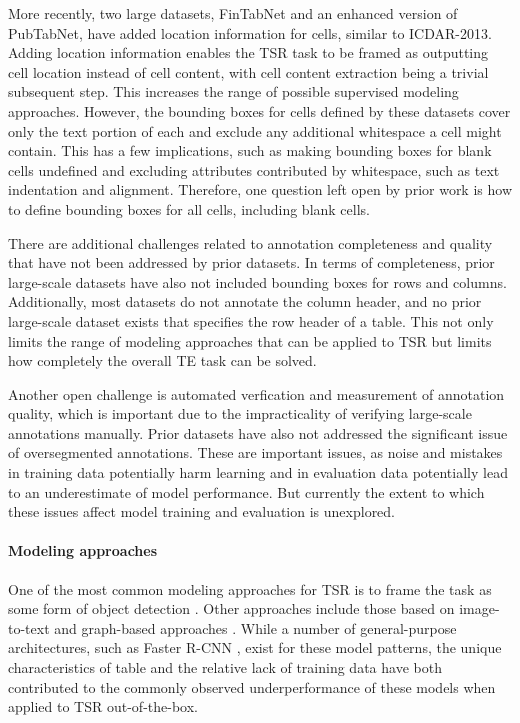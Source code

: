 \documentclass[10pt,twocolumn,letterpaper]{article}
\begin{document}
More recently, two large datasets, FinTabNet and an enhanced version of PubTabNet, have added location information for cells, similar to ICDAR-2013.
Adding location information enables the TSR task to be framed as outputting cell location instead of cell content, with cell content extraction being a trivial subsequent step.
This increases the range of possible supervised modeling approaches.
However, the bounding boxes for cells defined by these datasets cover only the text portion of each and exclude any additional whitespace a cell might contain.
This has a few implications, such as making bounding boxes for blank cells undefined and excluding attributes contributed by whitespace, such as text indentation and alignment.
Therefore, one question left open by prior work is how to define bounding boxes for all cells, including blank cells.

There are additional challenges related to annotation completeness and quality that have not been addressed by prior datasets.
In terms of completeness, prior large-scale datasets have also not included bounding boxes for rows and columns.
Additionally, most datasets do not annotate the column header, and no prior large-scale dataset exists that specifies the row header of a table.
This not only limits the range of modeling approaches that can be applied to TSR but limits how completely the overall TE task can be solved.

Another open challenge is automated verfication and measurement of annotation quality, which is important due to the impracticality of verifying large-scale annotations manually.
Prior datasets have also not addressed the significant issue of oversegmented annotations.
These are important issues, as noise and mistakes in training data potentially harm learning and in evaluation data potentially lead to an underestimate of model performance.
But currently the extent to which these issues affect model training and evaluation is unexplored.

\paragraph{Modeling approaches}

One of the most common modeling approaches for TSR is to frame the task as some form of object detection \cite{schreiber2017deepdesrt, prasad2020cascadetabnet, zheng2021global}.
Other approaches include those based on image-to-text \cite{li2020tablebank} and graph-based approaches \cite{qasim2019rethinking, chi2019complicated}.
While a number of general-purpose architectures, such as Faster R-CNN \cite{ren2015faster}, exist for these model patterns, the unique characteristics of table and the relative lack of training data have both contributed to the commonly observed underperformance of these models when applied to TSR out-of-the-box.
\end{document}
